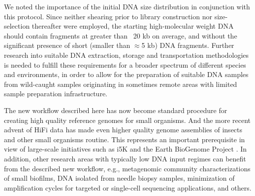 \par{
We noted the importance of the initial DNA size distribution in conjunction with this protocol. Since neither shearing prior to library construction nor size-selection thereafter were employed, the starting high-molecular weight DNA should contain fragments at greater than ~20 kb on average, and without the significant presence of short (smaller than $\approx$5 kb) DNA fragments. Further research into suitable DNA extraction, storage and transportation methodologies is needed to fulfill these requirements for a broader spectrum of different species and environments, in order to allow for the preparation of suitable DNA samples from wild-caught samples originating in sometimes remote areas with limited sample preparation infrastructure.
} 

\par{
The new workflow described here has now become standard procedure for creating high quality reference genomes for small organisms. And the more recent advent of HiFi data has made even higher quality genome assemblies of insects and other small organisms routine. This represents an important prerequisite in view of large-scale initiatives such as i5K and the Earth BioGenome Project \cite{EBGP}\cite{arthropoddiversity}. In addition, other research areas with typically low DNA input regimes can benefit from the described new workflow, e.g., metagenomic community characterizations of small biofilms, DNA isolated from needle biopsy samples, minimization of amplification cycles for targeted or single-cell sequencing applications, and others.
}


